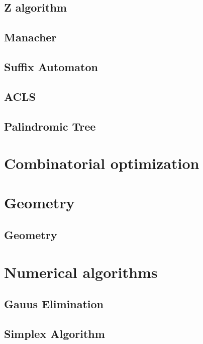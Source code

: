 \subsection{Z algorithm}
\raggedbottom
\hrulefill
\subsection{Manacher}
\raggedbottom
\hrulefill
\subsection{Suffix Automaton}
\raggedbottom
\hrulefill
\subsection{ACLS}
\raggedbottom
\hrulefill
\subsection{Palindromic Tree}
\raggedbottom
\hrulefill

\section{Combinatorial optimization}

\section{Geometry}
\subsection{Geometry}
\raggedbottom
\hrulefill

\section{Numerical algorithms}
\subsection{Gauus Elimination}
\raggedbottom
\hrulefill
\subsection{Simplex Algorithm}
\raggedbottom
\hrulefill
